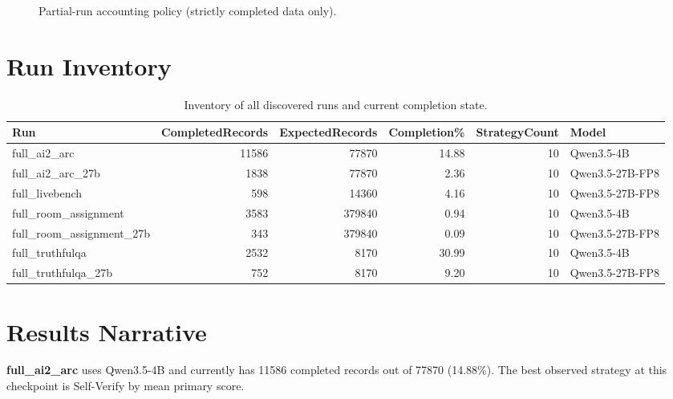 \documentclass[10pt,twocolumn]{article}
\begin{document}
\begin{figure}[t]
\centering
{}
\caption{Partial-run accounting policy (strictly completed data only).}
\label{fig:partial_policy}
\end{figure}

\section*{Run Inventory}
\begin{table}[t]
\centering
\caption{Inventory of all discovered runs and current completion state.}
\label{tab:run_inventory}
\begin{adjustbox}{max width=\textwidth}
\begin{tabular}{lrrrrl}
\toprule
Run & CompletedRecords & ExpectedRecords & Completion\% & StrategyCount & Model \\
\midrule
full\_ai2\_arc & 11586 & 77870 & 14.88 & 10 & Qwen3.5-4B \\
full\_ai2\_arc\_27b & 1838 & 77870 & 2.36 & 10 & Qwen3.5-27B-FP8 \\
full\_livebench & 598 & 14360 & 4.16 & 10 & Qwen3.5-27B-FP8 \\
full\_room\_assignment & 3583 & 379840 & 0.94 & 10 & Qwen3.5-4B \\
full\_room\_assignment\_27b & 343 & 379840 & 0.09 & 10 & Qwen3.5-27B-FP8 \\
full\_truthfulqa & 2532 & 8170 & 30.99 & 10 & Qwen3.5-4B \\
full\_truthfulqa\_27b & 752 & 8170 & 9.20 & 10 & Qwen3.5-27B-FP8 \\
\bottomrule
\end{tabular}
\end{adjustbox}
\end{table}
\section*{Results Narrative}
\textbf{full\_ai2\_arc} uses Qwen3.5-4B and currently has 11586 completed records out of 77870 (14.88\%). The best observed strategy at this checkpoint is Self-Verify by mean primary score.
\end{document}
